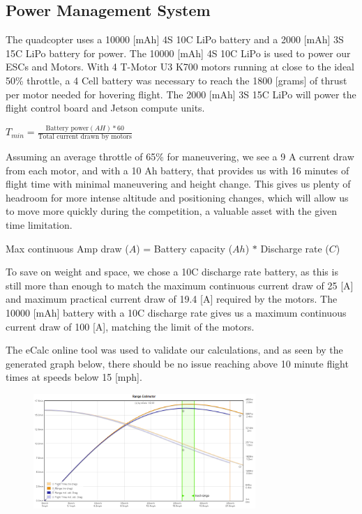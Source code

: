 \documentclass[12pt,letterpaper]{article}
\begin{document}
	\subsection*{Power Management System}
		The quadcopter uses a 10000 [mAh] 4S 10C LiPo battery and a 2000 [mAh] 3S 15C LiPo battery for power. The 10000 [mAh] 4S 10C LiPo is used to power our ESCs and Motors. With 4 T-Motor U3 K700 motors running at close to the ideal 50\% throttle, a 4 Cell battery was necessary to reach the 1800 [grams] of thrust per motor needed for hovering flight. The 2000 [mAh] 3S 15C LiPo will power the flight control board and Jetson compute units.
		\begin{center}
			$T_{min} = \frac{\text{Battery power}(AH) * 60}{\text{Total current drawn by motors}}$
		\end{center}

		Assuming an average throttle of 65\% for maneuvering, we see a 9 A current draw from each motor, and with a 10 Ah battery, that provides us with 16 minutes of flight time with minimal maneuvering and height change. This gives us plenty of headroom for more intense altitude and positioning changes, which will allow us to move more quickly during the competition, a valuable asset with the given time limitation.
		\begin{center}
			Max continuous Amp draw ($A$) = Battery capacity ($Ah$) $*$ Discharge rate ($C$)
		\end{center}

		To save on weight and space, we chose a 10C discharge rate battery, as this is still more than enough to match the maximum continuous current draw of 25 [A] and maximum practical current draw of 19.4 [A] required by the motors. The 10000 [mAh] battery with a 10C discharge rate gives us a maximum continuous current draw of 100 [A], matching the limit of the motors.

		The eCalc online tool was used to validate our calculations, and as seen by the generated graph below, there should be no issue reaching above 10 minute flight times at speeds below 15 [mph].

		\begin{figure}[!htbp]
			\begin{center}
				\includegraphics[width=0.75\textwidth]{powerGraph}
			\end{center}
		\end{figure}
\end{document}
